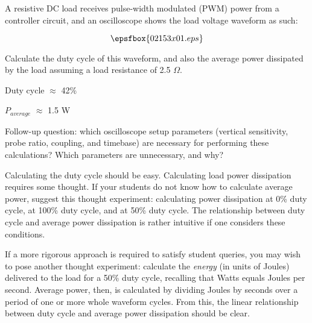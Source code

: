 

A resistive DC load receives pulse-width modulated (PWM) power from a controller circuit, and an oscilloscope shows the load voltage waveform as such:

$$\epsfbox{02153x01.eps}$$

Calculate the duty cycle of this waveform, and also the average power dissipated by the load assuming a load resistance of 2.5 $\Omega$.







Duty cycle $\approx$ 42\%

$P_{average}$ $\approx$ 1.5 W

\vskip 10pt

Follow-up question: which oscilloscope setup parameters (vertical sensitivity, probe ratio, coupling, and timebase) are necessary for performing these calculations?  Which parameters are unnecessary, and why?







Calculating the duty cycle should be easy.  Calculating load power dissipation requires some thought.  If your students do not know how to calculate average power, suggest this thought experiment: calculating power dissipation at 0\% duty cycle, at 100\% duty cycle, and at 50\% duty cycle.  The relationship between duty cycle and average power dissipation is rather intuitive if one considers these conditions.

If a more rigorous approach is required to satisfy student queries, you may wish to pose another thought experiment: calculate the {\it energy} (in units of Joules) delivered to the load for a 50\% duty cycle, recalling that Watts equals Joules per second.  Average power, then, is calculated by dividing Joules by seconds over a period of one or more whole waveform cycles.  From this, the linear relationship between duty cycle and average power dissipation should be clear.




